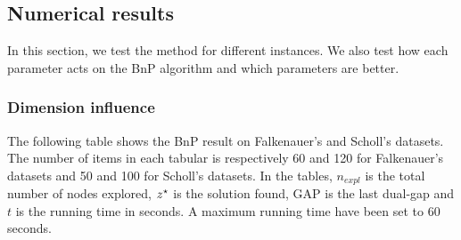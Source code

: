 \subsection{Numerical results}

In this section, we test the method for different instances. We also test how each parameter acts on the BnP algorithm and which parameters are better.

\subsubsection{Dimension influence}
The following table shows the BnP result on Falkenauer's and Scholl's datasets. The number of items in each tabular is respectively 60 and 120 for Falkenauer's datasets and 50 and 100 for Scholl's datasets. In the tables, $n_{expl}$ is the total number of nodes explored, ${z}^{\star}$ is the solution found, GAP is the last dual-gap and $t$ is the running time in seconds. A maximum running time have been set to 60 seconds.

